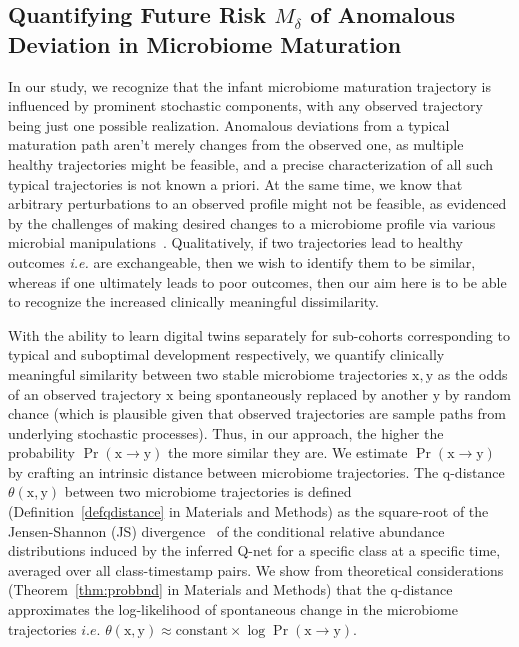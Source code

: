 \documentclass[onecolumn,10pt]{IEEEtran}
\def\x{\bm{\mathrm{x}}}
\def\y{\bm{\mathrm{y}}}
\def\qnet{Q-net\xspace}
\def\qdist{q-distance\xspace}
\def\x{\bm{\mathrm{x}}}
\def\y{\bm{\mathrm{y}}}
\def\erisk{$M_\delta$\xspace}
\def\Methods{Materials and Methods}
\begin{document}
\subsection*{Quantifying Future Risk \erisk of Anomalous  Deviation  in Microbiome Maturation}
In our study, we recognize that the infant microbiome maturation trajectory is influenced by prominent stochastic components, with any observed trajectory being just one possible realization. Anomalous deviations from a typical maturation path aren't merely changes from the observed one, as multiple healthy trajectories might be feasible, 
and a precise characterization of all such typical trajectories is not known a priori. At the same time, we know that arbitrary perturbations to an observed profile might not be feasible, as evidenced by the challenges of making desired changes to a microbiome profile via various microbial manipulations~\cite{lopez2016fecal}. Qualitatively,  if two trajectories lead to healthy outcomes \textit{i.e.} are exchangeable, then we wish to identify them to be similar, whereas if one ultimately leads to poor  outcomes, then our aim here is to be able to recognize the increased clinically meaningful dissimilarity.

With the ability to learn digital twins separately for sub-cohorts corresponding to typical and suboptimal development respectively, we quantify clinically  meaningful similarity between two stable microbiome trajectories $\x,\y$ as  the odds of an observed  trajectory $\x$ being spontaneously replaced by another  $\y$  by random chance (which is plausible given that observed trajectories are sample paths from underlying stochastic processes). Thus, in our approach, the higher the probability $\operatorname{Pr}(\x \rightarrow \y)$ the more similar they are. We estimate $\operatorname{Pr}(\x \rightarrow \y)$ by crafting an intrinsic distance between  microbiome trajectories. The \qdist  $\theta(\x,\y)$ between two microbiome trajectories is defined (Definition~\ref{defqdistance} in \Methods) as the square-root of the Jensen-Shannon (JS) divergence~\cite{cover} of the conditional relative abundance distributions induced by the inferred \qnet for a  specific class at a  specific time, averaged over all class-timestamp pairs. We show from theoretical considerations (Theorem~\ref{thm:probbnd} in \Methods) that the \qdist  approximates the log-likelihood of  spontaneous change in the microbiome trajectories  $i.e.$ $\theta(\x,\y) \approx \textrm{constant} \times \log \operatorname{Pr}(\x \rightarrow \y)$. 
\end{document}
